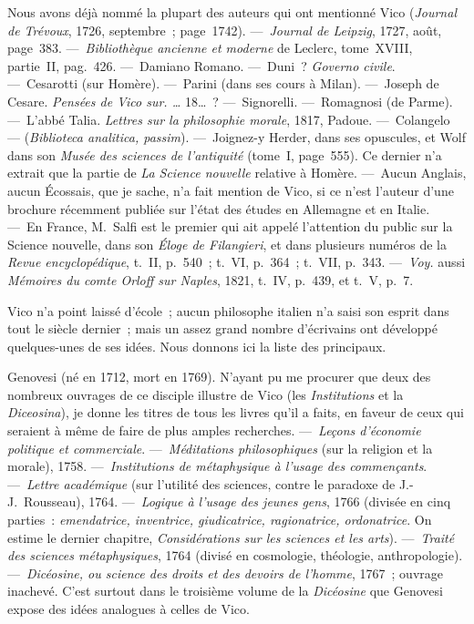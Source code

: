 \documentclass[french,twoside]{book} %
\begin{document}
\par
Nous avons déjà nommé la plupart des auteurs qui ont mentionné Vico ({\itshape Journal de Trévoux}, 1726, septembre ; page 1742). — {\itshape Journal de Leipzig}, 1727, août, page 383. — {\itshape Bibliothèque ancienne et moderne} de Leclerc, tome XVIII, partie II, pag. 426. — Damiano Romano. — Duni ? {\itshape Governo civile}. — Cesarotti (sur Homère). — Parini (dans ses cours à Milan). — Joseph de Cesare. {\itshape Pensées de Vico sur. …} 18… ? — Signorelli. — Romagnosi (de Parme). — L’abbé Talia. {\itshape Lettres sur la philosophie morale}, 1817, Padoue. — Colangelo — ({\itshape Biblioteca analitica, passim}). — Joignez-y Herder, dans ses opuscules, et Wolf dans son {\itshape Musée des sciences de l’antiquité} (tome I, page 555). Ce dernier n’a extrait que la partie de {\itshape La Science nouvelle} relative à Homère. — Aucun Anglais, aucun Écossais, que je sache, n’a fait mention de Vico, si ce n’est l’auteur d’une brochure récemment publiée sur l’état des études en Allemagne et en Italie. — En France, M. Salfi est le premier qui ait appelé l’attention du public sur la Science nouvelle, dans son {\itshape Éloge de Filangieri}, et dans plusieurs numéros de la {\itshape Revue encyclopédique}, t. II, p. 540 ; t. VI, p. 364 ; t. VII, p. 343. — {\itshape Voy.} aussi {\itshape Mémoires du comte Orloff sur Naples}, 1821, t. IV, p. 439, et t. V, p. 7.\par
Vico n’a point laissé d’école ; aucun philosophe italien n’a  saisi son esprit dans tout le siècle dernier ; mais un assez grand nombre d’écrivains ont développé quelques-unes de ses idées. Nous donnons ici la liste des principaux.\par
Genovesi (né en 1712, mort en 1769). N’ayant pu me procurer que deux des nombreux ouvrages de ce disciple illustre de Vico (les {\itshape Institutions} et la {\itshape Diceosina}), je donne les titres de tous les livres qu’il a faits, en faveur de ceux qui seraient à même de faire de plus amples recherches. — {\itshape Leçons d’économie politique et commerciale}. — {\itshape Méditations philosophiques} (sur la religion et la morale), 1758. — {\itshape Institutions de métaphysique à l’usage des commençants}. — {\itshape Lettre académique} (sur l’utilité des sciences, contre le paradoxe de J.-J. Rousseau), 1764. — {\itshape Logique à l’usage des jeunes gens}, 1766 (divisée en cinq parties : {\itshape emendatrice, inventrice, giudicatrice, ragionatrice, ordonatrice}. On estime le dernier chapitre, {\itshape Considérations sur les sciences et les arts}). — {\itshape Traité des sciences métaphysiques}, 1764 (divisé en cosmologie, théologie, anthropologie). — {\itshape Dicéosine, ou science des droits et des devoirs de l’homme}, 1767 ; ouvrage inachevé. C’est surtout dans le troisième volume de la {\itshape Dicéosine} que Genovesi expose des idées analogues à celles de Vico.\par
\end{document}
